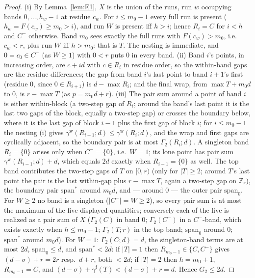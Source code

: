 \documentclass[11pt,a4paper]{article}
\numberwithin{equation}{section}
\theoremstyle{plain}
\theoremstyle{definition}
\theoremstyle{remark}
\newcommand{\Z}{\mathbb{Z}}
\begin{document}
\begin{proof}
(i) By Lemma~\ref{lem:E1}, $X$ is the union of the runs, run $w$
occupying bands $0,\dots,h_w-1$ at residue $c_w$. For $i\le m_0-1$ every
full run is present ($h_w=F(c_w)\ge m_0>i$), and run $W$ is present iff
$h>i$; hence $R_i=C$ for $i<h$ and $C^-$ otherwise. Band $m_0$ sees
exactly the full runs with $F(c_w)>m_0$, i.e.\ $c_w<r$, plus run $W$ iff
$h>m_0$: that is $T$. The nesting is immediate, and $0=c_0\in C^-$ (as
$W\ge1$) with $0<r$ puts $0$ in every band. (ii) Band $i$'s points, in
increasing order, are $c+id$ with $c\in R_i$ in residue order, so the
within-band gaps are the residue differences; the gap from band $i$'s
last point to band $i{+}1$'s first (residue $0$, since $0\in
R_{i+1}$) is $d-\max R_i$; and the final wrap, from $\max T+m_0d$ to
$0$, is $r-\max T$ (as $p=m_0d+r$). (iii) The pair sum around a point
of band $i$ is either within-block (a two-step gap of $R_i$; around the
band's last point it is the last two gaps of the block, equally a
two-step gap) or crosses the boundary below, where it is the last gap
of block $i-1$ plus the first gap of block $i$; for $i\le m_0-1$ the
nesting (i) gives $\gamma^{\mathrm w}(R_{i-1};d)\le\gamma^{\mathrm
w}(R_i;d)$, and the wrap and first gaps are cyclically adjacent, so the
boundary pair is at most $\Gamma_2(R_i;d)$. A singleton band $R_i=\{0\}$
arises only when $C^-=\{0\}$, i.e.\ $W=1$; its lone point has pair sum
$\gamma^{\mathrm w}(R_{i-1};d)+d$, which equals $2d$ exactly when
$R_{i-1}=\{0\}$ as well. The top band contributes the two-step gaps of
$T$ on $[0,r)$ (only for $|T|\ge2$; around $T$'s last point the pair is
the last within-gap plus $r-\max T$, again a two-step gap on $\Z_r$),
the boundary pair $\mathrm{span}^\ast$ around $m_0d$, and --- around
$0$ --- the outer pair $\mathrm{span}_0$. For $W\ge2$ no band is a
singleton ($|C^-|=W\ge2$), so every pair sum is at most the maximum of
the five displayed quantities; conversely each of the five is realized
as a pair sum of $X$ ($\Gamma_2(C)$ in band $0$; $\Gamma_2(C^-)$ in a
$C^-$-band, which exists exactly when $h\le m_0-1$; $\Gamma_2(T;r)$ in
the top band; $\mathrm{span}_0$ around $0$; $\mathrm{span}^\ast$ around
$m_0d$). For $W=1$: $\Gamma_2(C;d)=d$, the singleton-band terms are at
most $2d$, $\mathrm{span}_0\le d$, and $\mathrm{span}^\ast<2d$: if $|T|=1$
then $R_{m_0-1}\in\{C,C^-\}$ gives $(d-\sigma)+r=2r$ resp.\ $d+r$,
both $<2d$; if $|T|=2$ then $h=m_0+1$, $R_{m_0-1}=C$, and
$(d-\sigma)+\gamma^{\mathrm f}(T)<(d-\sigma)+r=d$. Hence $G_2\le2d$.
\end{proof}
\end{document}
